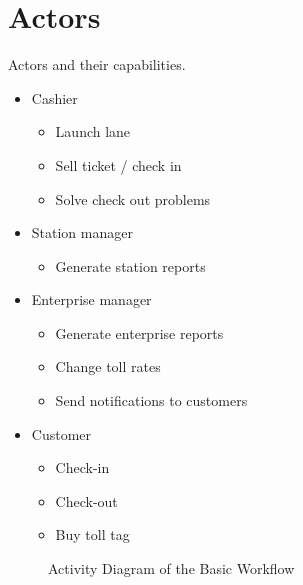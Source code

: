 \section{Actors}
Actors and their capabilities.
\begin{itemize}
\item Cashier

\begin{itemize}
  \item Launch lane
  \item Sell ticket / check in
  \item Solve check out problems
\end{itemize}
\end{itemize}

\begin{itemize}
\item Station manager

\begin{itemize}
  \item Generate station reports
\end{itemize}
\end{itemize}

\begin{itemize}
\item Enterprise manager

\begin{itemize}
  \item Generate enterprise reports
  \item Change toll rates
  \item Send notifications to customers
\end{itemize}
\end{itemize}

\begin{itemize}
\item Customer

\begin{itemize}
  \item Check-in
  \item Check-out
  \item Buy toll tag
\end{itemize}
\end{itemize}


\begin{figure}

\caption{Activity Diagram of the Basic Workflow}
\end{figure}

